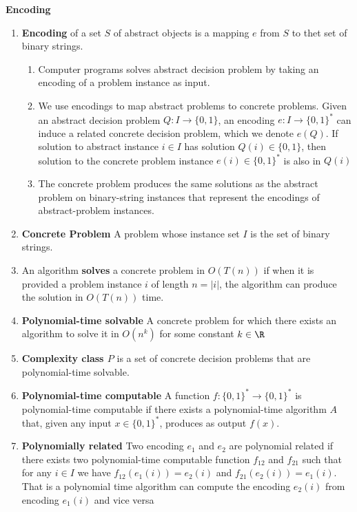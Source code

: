 \documentclass[11pt]{article}
\begin{document}
\begin{defn*}
    \textbf{Encoding}
    \begin{enumerate}
        \item \textbf{Encoding} of a set $S$ of abstract objects is a mapping $e$ from $S$ to thet set of binary strings. 
        \begin{enumerate}
            \item Computer programs solves abstract decision problem by taking an encoding of a problem instance as input.
            \item We use encodings to map abstract problems to concrete problems. Given an abstract decision problem $Q: I \to \{0,1\}$, an encoding $e: I \to \{0, 1 \}^*$ can induce a related concrete decision problem, which we denote $e(Q)$. If solution to abstract instance $i\in I$ has solution $Q(i) \in \{0, 1\}$, then solution to the concrete problem instance $e(i)\in \{ 0, 1\}^*$ is also in $Q(i)$
            \item The concrete problem produces the same solutions as the abstract problem on binary-string instances that represent the encodings of abstract-problem instances.
        \end{enumerate}
        \item \textbf{Concrete Problem} A problem whose instance set $I$ is the set of binary strings. 
        \item An algorithm \textbf{solves} a concrete problem in $O(T(n))$ if when it is provided a problem instance $i$ of length $n = |i|$, the algorithm can produce the solution in $O(T(n))$ time. 
        \item \textbf{Polynomial-time solvable} A concrete problem for which there exists an algorithm to solve it in $O(n^k)$ for some constant $k\in \R$
        \item \textbf{Complexity class $P$} is a set of concrete decision problems that are polynomial-time solvable.
        \item \textbf{Polynomial-time computable} A function $f: \{0,1\}^* \to \{0,1\}^*$ is polynomial-time computable if there exists a polynomial-time algorithm $A$ that, given any input $x \in \{ 0, 1\}^*$, produces as output $f(x)$. 
        \item \textbf{Polynomially related} Two encoding $e_1$ and $e_2$ are polynomial related if there exists two polynomial-time computable function $f_{12}$ and $f_{21}$ such that for any $i\in I$ we have $f_{12}(e_1(i)) = e_2(i)$ and $f_{21}(e_2(i)) = e_1(i)$. That is a polynomial time algorithm can compute the encoding $e_2(i)$ from encoding $e_1(i)$ and vice versa 
    \end{enumerate}
\end{defn*}
\end{document}
